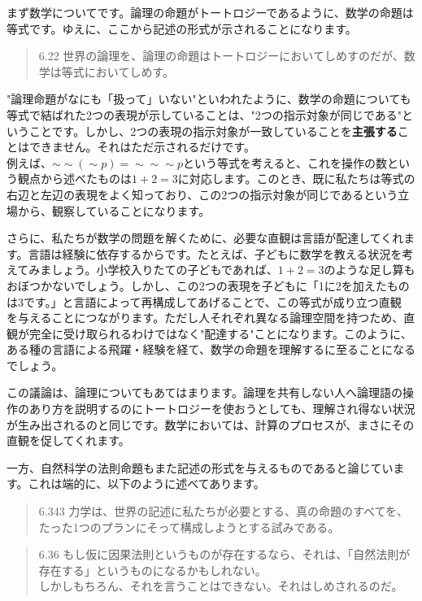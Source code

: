 \documentclass[12pt]{jsarticle}
\begin{document}
\par
まず数学についてです。論理の命題がトートロジーであるように、数学の命題は等式です。ゆえに、ここから記述の形式が示されることになります。
\begin{quote}
6.22 世界の論理を、論理の命題はトートロジーにおいてしめすのだが、数学は等式においてしめす。
\end{quote}
\par
"論理命題がなにも「扱って」いない"といわれたように、数学の命題についても等式で結ばれた2つの表現が示していることは、"2つの指示対象が同じである"ということです。しかし、2つの表現の指示対象が一致していることを\textbf{主張する}ことはできません。それはただ示されるだけです。\\
例えば、$\sim\sim(\sim p)=\sim\sim\sim p$という等式を考えると、これを操作の数という観点から述べたものは$1+2=3$に対応します。このとき、既に私たちは等式の右辺と左辺の表現をよく知っており、この2つの指示対象が同じであるという立場から、観察していることになります。
\par
さらに、私たちが数学の問題を解くために、必要な直観は言語が配達してくれます。言語は経験に依存するからです。たとえば、子どもに数学を教える状況を考えてみましょう。小学校入りたての子どもであれば、$1+2=3$のような足し算もおぼつかないでしょう。しかし、この2つの表現を子どもに「1に2を加えたものは3です。」と言語によって再構成してあげることで、この等式が成り立つ直観
を与えることにつながります。ただし人それぞれ異なる論理空間を持つため、直観が完全に受け取られるわけではなく"配達する"ことになります。このように、ある種の言語による飛躍・経験を経て、数学の命題を理解するに至ることになるでしょう。\par
この議論は、論理についてもあてはまります。論理を共有しない人へ論理語の操作のあり方を説明するのにトートロジーを使おうとしても、理解され得ない状況が生み出されるのと同じです。数学においては、計算のプロセスが、まさにその直観を促してくれます。
\par
一方、自然科学の法則命題もまた記述の形式を与えるものであると論じています。これは端的に、以下のように述べてあります。

\begin{quote}
6.343 力学は、世界の記述に私たちが必要とする、真の命題のすべてを、たった1つのプランにそって構成しようとする試みである。
\end{quote}
\begin{quote}
6.36 もし仮に因果法則というものが存在するなら、それは、「自然法則が存在する」というものになるかもしれない。\\
しかしもちろん、それを言うことはできない。それはしめされるのだ。
\end{quote}
\end{document}
